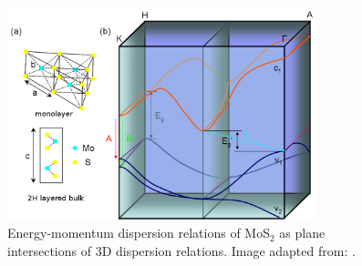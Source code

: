 \begin{figure}[htbp!] 
\centering  
\includegraphics[width=0.8\textwidth]{mos2_band.png}
\caption{Energy-momentum dispersion relations of MoS$_2$ as plane intersections of 3D dispersion relations. Image adapted from: \cite{Mak2010}. }  
\label{fig:mos2_band}
\end{figure} 


